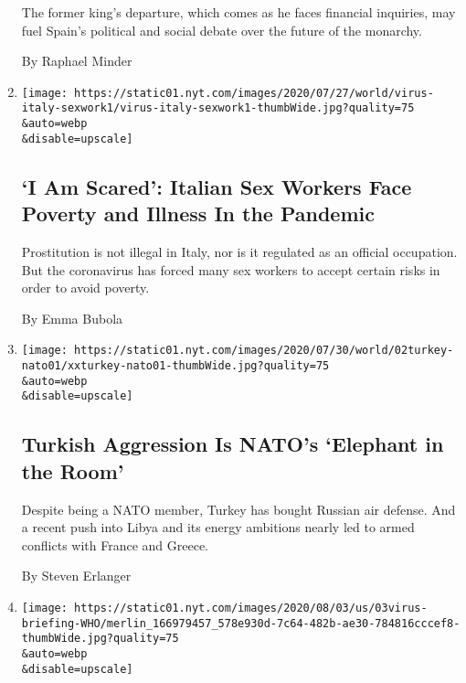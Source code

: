 \begin{enumerate}
  The former king's departure, which comes as he faces financial
  inquiries, may fuel Spain's political and social debate over the
  future of the monarchy.

  By Raphael Minder
\item
  \href{/2020/08/03/world/europe/italy-coronavirus-prostitution-sex-work.html}{}

  \texttt{[image: https://static01.nyt.com/images/2020/07/27/world/virus-italy-sexwork1/virus-italy-sexwork1-thumbWide.jpg?quality=75\\\&auto=webp\\\&disable=upscale]}

  \hypertarget{i-am-scared-italian-sex-workers-face-poverty-and-illness-in-the-pandemic}{%
  \subsection{`I Am Scared': Italian Sex Workers Face Poverty and
  Illness In the
  Pandemic}\label{i-am-scared-italian-sex-workers-face-poverty-and-illness-in-the-pandemic}}

  Prostitution is not illegal in Italy, nor is it regulated as an
  official occupation. But the coronavirus has forced many sex workers
  to accept certain risks in order to avoid poverty.

  By Emma Bubola
\item
  \href{/2020/08/03/world/europe/turkey-nato.html}{}

  \texttt{[image: https://static01.nyt.com/images/2020/07/30/world/02turkey-nato01/xxturkey-nato01-thumbWide.jpg?quality=75\\\&auto=webp\\\&disable=upscale]}

  \hypertarget{turkish-aggression-is-natos-elephant-in-the-room}{%
  \subsection{Turkish Aggression Is NATO's `Elephant in the
  Room'}\label{turkish-aggression-is-natos-elephant-in-the-room}}

  Despite being a NATO member, Turkey has bought Russian air defense.
  And a recent push into Libya and its energy ambitions nearly led to
  armed conflicts with France and Greece.

  By Steven Erlanger
\item
  \href{/video/world/europe/100000007269932/who-coronavirus-briefing.html}{}

  \texttt{[image: https://static01.nyt.com/images/2020/08/03/us/03virus-briefing-WHO/merlin\_166979457\_578e930d-7c64-482b-ae30-784816cccef8-thumbWide.jpg?quality=75\\\&auto=webp\\\&disable=upscale]}


\end{enumerate}
